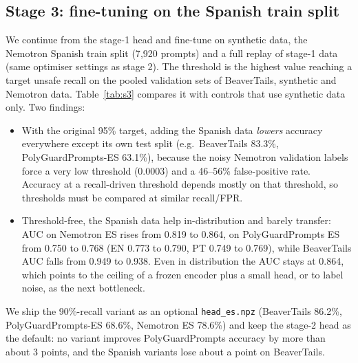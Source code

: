 \documentclass[conference]{IEEEtran}
\begin{document}
\subsection{Stage 3: fine-tuning on the Spanish train split}\label{sec:stage3}
We continue from the stage-1 head and fine-tune on synthetic data, the Nemotron Spanish train split (7{,}920 prompts) and a full replay of stage-1 data (same optimiser settings as stage 2). The threshold is the highest value reaching a target unsafe recall on the pooled validation sets of BeaverTails, synthetic and Nemotron data. Table~\ref{tab:s3} compares it with controls that use synthetic data only. Two findings:
\begin{itemize}
\item With the original 95\% target, adding the Spanish data \emph{lowers} accuracy everywhere except its own test split (e.g.\ BeaverTails 83.3\%, PolyGuardPrompts-ES 63.1\%), because the noisy Nemotron validation labels force a very low threshold (0.0003) and a 46--56\% false-positive rate. Accuracy at a recall-driven threshold depends mostly on that threshold, so thresholds must be compared at similar recall/FPR.
\item Threshold-free, the Spanish data help in-distribution and barely transfer: AUC on Nemotron ES rises from 0.819 to 0.864, on PolyGuardPrompts ES from 0.750 to 0.768 (EN 0.773 to 0.790, PT 0.749 to 0.769), while BeaverTails AUC falls from 0.949 to 0.938. Even in distribution the AUC stays at 0.864, which points to the ceiling of a frozen encoder plus a small head, or to label noise, as the next bottleneck.
\end{itemize}
We ship the 90\%-recall variant as an optional \texttt{head\_es.npz} (BeaverTails 86.2\%, PolyGuardPrompts-ES 68.6\%, Nemotron ES 78.6\%) and keep the stage-2 head as the default: no variant improves PolyGuardPrompts accuracy by more than about 3 points, and the Spanish variants lose about a point on BeaverTails.
\end{document}
